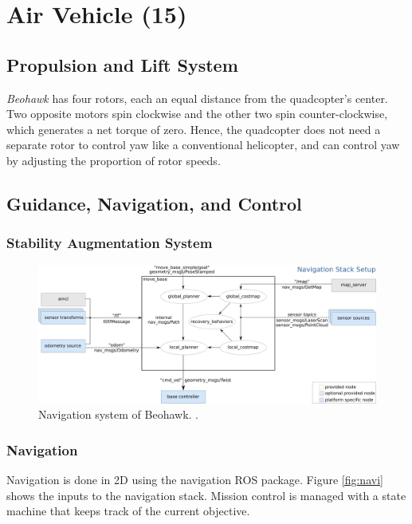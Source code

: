 \documentclass[12pt, letterpaper]{article}
\begin{document}
\section{Air Vehicle (15)}

\subsection{Propulsion and Lift System}
\emph{Beohawk} has four rotors, each an equal distance from the quadcopter's center.  Two opposite motors spin clockwise and the other two spin counter-clockwise, which generates a net torque of zero.  Hence, the quadcopter does not need a separate rotor to control yaw like a conventional helicopter, and can control yaw by adjusting the proportion of rotor speeds.  

\subsection{Guidance, Navigation, and Control}

\subsubsection{Stability Augmentation System}

\begin{figure}[h]
\centering
\includegraphics[width=12cm]{images/overview_tf.png}
\caption{Navigation system of Beohawk. .} 
\label{fig:navi}
\end{figure}

\subsubsection{Navigation}
Navigation is done in 2D using the navigation ROS package. Figure \eqref{fig:navi} shows the inputs to the navigation stack. Mission control is managed with a state machine that keeps track of the current objective.  
\end{document}
